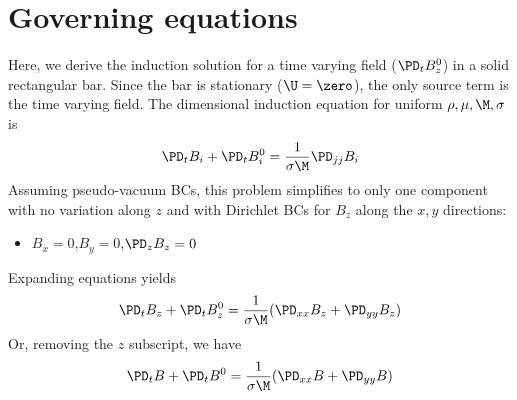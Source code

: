 \documentclass[11pt]{article}
\begin{document}
\MOONSTITLE
\maketitle
\section{Governing equations}
Here, we derive the induction solution for a time varying field ($\PD_t B_z^0$) in a solid rectangular bar. Since the bar is stationary ($\U=\zero$), the only source term is the time varying field. The dimensional induction equation for uniform $\rho,\mu,\M,\sigma$ is
\begin{equation}\begin{aligned}
\PD_t B_i + \PD_t B_i^0 = \frac{1}{\sigma \M} \PD_{jj} B_i
\end{aligned} \end{equation}
Assuming pseudo-vacuum BCs, this problem simplifies to only one component with no variation along $z$ and with Dirichlet BCs for $B_z$ along the $x,y$ directions:
\begin{itemize}\setlength\itemsep{-1em}
	\item $B_x=0$,$B_y=0$,$\PD_z B_z = 0$
\end{itemize}
Expanding equations yields
\begin{equation}\begin{aligned}
\PD_t B_z + \PD_t B_z^0 = \frac{1}{\sigma \M} (\PD_{xx} B_z + \PD_{yy} B_z) \\
\end{aligned} \end{equation}
Or, removing the $z$ subscript, we have
\begin{equation}\begin{aligned}
\PD_t B + \PD_t B^0 = \frac{1}{\sigma \M} (\PD_{xx} B + \PD_{yy} B) \\
\end{aligned} \end{equation}
\end{document}
